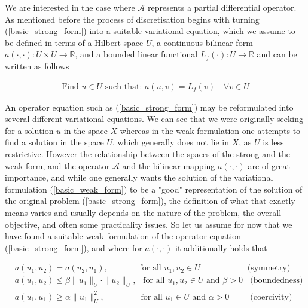 \documentclass[../draft_1.tex]{subfiles}
\begin{document}
We are interested in the case where $\mathcal{A}$ represents a partial differential operator. As mentioned before the process of discretisation begins with turning (\ref{basic_strong_form}) into a suitable variational equation, which we assume to be defined in terms of a Hilbert space $U$, a continuous bilinear form $a(\cdot, \cdot): U \times U \rightarrow \mathbb{R}$, and a bounded linear functional $L_f(\cdot): U \rightarrow \mathbb{R}$ and can be written as follows
\begin{ceqn}
\begin{equation}
\begin{aligned}
\label{basic_weak_form}
\text{Find } u \in U \text{ such that:  } a(u, v) = L_f(v) \quad \forall v \in U
\end{aligned}
\end{equation}
\end{ceqn}
An operator equation such as (\ref{basic_strong_form}) may be reformulated into several different variational equations. We can see that we were originally seeking for a solution $u$ in the space $X$ whereas in the weak formulation one attempts to find a solution in the space $U$, which generally does not lie in $X$, as $U$ is less restrictive. However the relationship between the spaces of the strong and the weak form, and the operator $\mathcal{A}$ and the bilinear mapping $a(\cdot, \cdot)$ are of great importance, and while one generally wants the solution of the variational formulation (\ref{basic_weak_form}) to be a "good" representation of the solution of the original problem (\ref{basic_strong_form}), the definition of what that exactly means varies and usually depends on the nature of the problem, the overall objective, and often some practicality issues. So let us assume for now that we have found a suitable weak formulation of the operator equation (\ref{basic_strong_form}), and where for $a(\cdot, \cdot)$ it additionally holds that 
\begin{ceqn}
\begin{align}
	&a(u_1, u_2) = a(u_2, u_1), \qquad \ \ \quad \text{ for all } u_1, u_2 \in U \quad &\text{(symmetry)} \\
	&a(u_1, u_2) \leq \beta \|u_1\|_U \cdot \|u_2\|_U , \ \  \text{ for all } u_1, u_2 \in U \text{ and } \beta > 0 &\text{ (boundedness)} \\
    &a(u_1, u_1) \geq \alpha \|u_1\|_U^2, \qquad \quad \quad  \text{ for all } u_1 \in U \text{ and } \alpha > 0 &\text{ (coercivity)}
	\end{align}	
	\end{ceqn}
\end{document}
